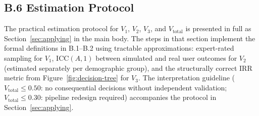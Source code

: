 \documentclass[preprint,12pt]{elsarticle}
\newcommand{\vtot}{V_{\text{total}}}
\begin{document}
\subsection*{B.6 Estimation Protocol}

The practical estimation protocol for $V_1$, $V_2$, $V_3$, and $\vtot$ is
presented in full as Section~\ref{sec:applying} in the main body. The steps in
that section implement the formal definitions in B.1--B.2 using tractable
approximations: expert-rated sampling for $V_1$, $\mathrm{ICC}(A,1)$ between
simulated and real user outcomes for $V_2$ (estimated separately per demographic
group), and the structurally correct IRR metric from Figure~\ref{fig:decision-tree}
for $V_3$. The interpretation guideline ($\vtot \leq 0.50$: no consequential
decisions without independent validation; $\vtot \leq 0.30$: pipeline redesign
required) accompanies the protocol in Section~\ref{sec:applying}.
\end{document}
